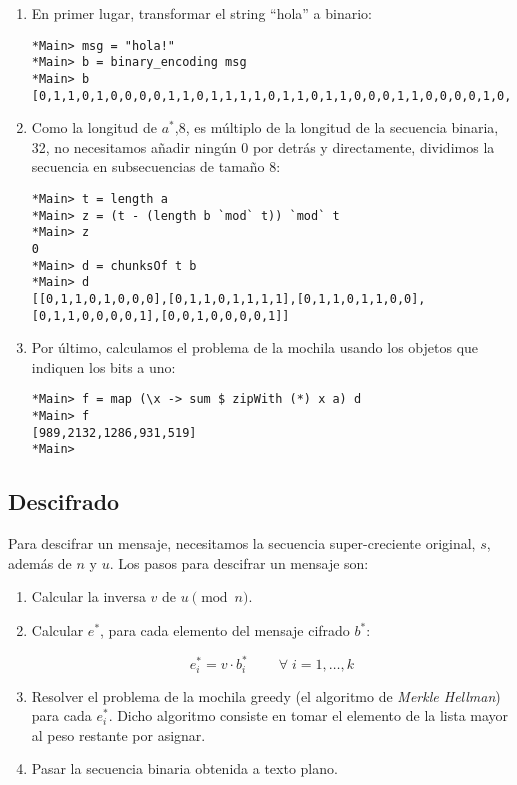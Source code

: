 \documentclass[10pt,spanish]{article}
\begin{document}
\begin{enumerate}
    \item En primer lugar, transformar el string ``hola'' a binario:

\begin{verbatim}
*Main> msg = "hola!"
*Main> b = binary_encoding msg
*Main> b
[0,1,1,0,1,0,0,0,0,1,1,0,1,1,1,1,0,1,1,0,1,1,0,0,0,1,1,0,0,0,0,1,0,0,1,0,0,0,0,1]
\end{verbatim}

    \item Como la longitud de $a^*$,8, es múltiplo de la longitud de la secuencia binaria, 32, no necesitamos añadir ningún 0 por detrás y directamente, dividimos la secuencia en subsecuencias de tamaño 8:

\begin{verbatim}
*Main> t = length a
*Main> z = (t - (length b `mod` t)) `mod` t
*Main> z
0
*Main> d = chunksOf t b
*Main> d
[[0,1,1,0,1,0,0,0],[0,1,1,0,1,1,1,1],[0,1,1,0,1,1,0,0],[0,1,1,0,0,0,0,1],[0,0,1,0,0,0,0,1]]
\end{verbatim}

    \item Por último, calculamos el problema de la mochila usando los objetos que indiquen los bits a uno:

\begin{verbatim}
*Main> f = map (\x -> sum $ zipWith (*) x a) d
*Main> f
[989,2132,1286,931,519]
*Main> 
\end{verbatim}
\end{enumerate}

\subsection{\textcolor{azul}Descifrado}
Para descifrar un mensaje, necesitamos la secuencia super-creciente original, $s$, además de $n$ y $u$. Los pasos para descifrar un mensaje son:

\begin{enumerate}
    \item Calcular la inversa $v$ de $u \pmod n$.

    \item Calcular $e^*$, para cada elemento del mensaje cifrado $b^*$:

    \begin{displaymath}
        e^*_i = v \cdot b^*_i \qquad\ \forall\; i=1,\ldots,k
    \end{displaymath}

    \item Resolver el problema de la mochila greedy (el algoritmo de \textit{\textcolor{azul}{Merkle Hellman}}) para cada $e^*_i$. Dicho algoritmo consiste en tomar el elemento de la lista mayor al peso restante por asignar.

    \item Pasar la secuencia binaria obtenida a texto plano.
\end{enumerate}
\end{document}
